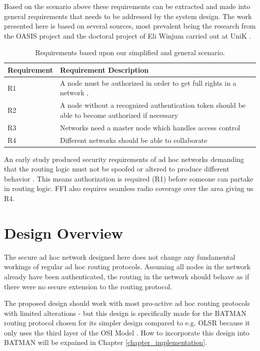 Based on the scenario above these requirements can be extracted and made into
general requirements that needs to be addressed by the system design. The work
presented here is based on several sources, most prevalent being the research
from the OASIS project \cite{oasis_report} \cite{5683058} \cite{nyre2009secure}
and the doctoral project of Eli Winjum carried out at UniK
\cite{ffi_2005_04015}.

\begin{table}[ht!]
	\centering
	\begin{tabular}{ | l | p{11cm} | }
	\hline
	\textbf{Requirement} & \textbf{Requirement Description}\\\hline
		R1 & A node must be authorized in order to get full rights in a
		network \cite{dahill2001secure}, \cite{sanzgiri2002secure}\\\hline
		R2 & A node without a recognized authentication token should be able to become
		authorized if necessary\\ \hline
		R3 & Networks need a master node which handles access control\\\hline
		R4 & Different networks should be able to collaborate
		\cite{ffi_2005_04015}\\\hline
	\end{tabular}
	\caption{Requirements based upon our simplified and general scenario.}
	\label{tab:our_req}
\end{table}

An early study produced security requirements of ad hoc networks demanding
that the routing logic must not be spoofed or altered to produce different
behavior \cite{dahill2001secure}. This means authorization is required (R1)
before someone can partake in routing logic. FFI also requires seamless radio coverage over the
area giving us R4.

\section{Design Overview}
The secure ad hoc network designed here does not change any fundamental workings
of regular ad hoc routing protocols. Assuming all nodes in the network already
have been authenticated, the routing in the network should behave as if there
were no secure extension to the routing protocol.

The proposed design should work with most pro-active ad hoc routing protocols
with limited alterations - but this design is specifically made for the
BATMAN \cite{batman_rfc} routing protocol chosen for its simpler design compared to
e.g. OLSR \cite{clausen2003rfc3626} because it only uses the third layer of the
OSI Model \cite{zimmermann1980osi}. How to incorporate this design into BATMAN will be
expained in Chapter \ref{chapter_implementation}.

